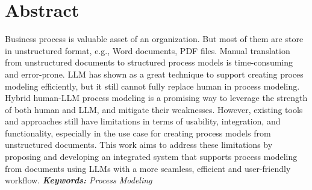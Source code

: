 \chapter*{Abstract}
\noindent
Business process is valuable asset of an organization. But most of them are store in unstructured
format, e.g., Word documents, PDF files. Manual translation from unstructured documents to
structured process models is time-consuming and error-prone. LLM has shown as a great technique
to support creating proces modeling efficiently, but it still cannot fully replace human in process
modeling. Hybrid human-LLM process modeling is a promising way to leverage the strength of
both human and LLM, and mitigate their weaknesses. However, existing tools and approaches still
have limitations in terms of usability, integration, and functionality, especially in the use case for
creating process models from unstructured documents. This work aims to address these limitations
by proposing and developing an integrated system that supports process modeling from documents
using LLMs with a more seamless, efficient and user-friendly workflow.
\textit{\textbf{Keywords: }Process Modeling}

